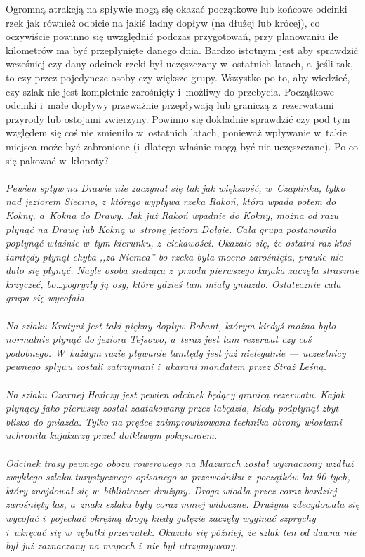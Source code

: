 \documentclass[a5paper,10pt,titlepage,twoside]{article}
\begin{document}
Ogromną atrakcją na spływie mogą się okazać początkowe lub końcowe odcinki rzek jak również odbicie na jakiś ładny dopływ (na dłużej lub krócej), co oczywiście powinno się uwzględnić podczas przygotowań, przy planowaniu ile kilometrów ma być przepłynięte danego dnia. Bardzo istotnym jest aby sprawdzić wcześniej czy dany odcinek rzeki był uczęszczany w~ostatnich latach, a~jeśli tak, to czy przez pojedyncze osoby czy większe grupy. Wszystko po to, aby wiedzieć, czy szlak nie jest kompletnie zarośnięty i~możliwy do przebycia. Początkowe odcinki i~małe dopływy przeważnie przepływają lub graniczą z~rezerwatami przyrody lub ostojami zwierzyny. Powinno się dokładnie sprawdzić czy pod tym względem się coś nie zmieniło w~ostatnich latach, ponieważ wpływanie w~takie miejsca może być zabronione (i~dlatego właśnie mogą być nie uczęszczane). Po co się pakować w~kłopoty?
\\
\\
\small{
\emph{Pewien spływ na Drawie nie zaczynał się tak jak większość, w~Czaplinku, tylko nad jeziorem Siecino, z~którego wypływa rzeka Rakoń, która wpada potem do Kokny, a~Kokna do Drawy. Jak już Rakoń wpadnie do Kokny, można od razu płynąć na Drawę lub Kokną w~stronę jeziora Dołgie. Cała grupa postanowiła popłynąć właśnie w~tym kierunku, z~ciekawości. Okazało się, że ostatni raz ktoś tamtędy płynął chyba ,,za Niemca'' bo rzeka była mocno zarośnięta, prawie nie dało się płynąć. Nagle osoba siedząca z~przodu pierwszego kajaka zaczęła strasznie krzyczeć, bo\ldots pogryzły ją osy, które gdzieś tam miały gniazdo. Ostatecznie cała grupa się wycofała.}}
\\
\\
\small{
\emph{Na szlaku Krutyni jest taki piękny dopływ Babant, którym kiedyś można było normalnie płynąć do jeziora Tejsowo, a~teraz jest tam rezerwat czy coś podobnego. W~każdym razie pływanie tamtędy jest już nielegalnie --- uczestnicy pewnego spływu zostali zatrzymani i~ukarani mandatem przez Straż Leśną.}}
\\
\\
\small{
\emph{Na szlaku Czarnej Hańczy jest pewien odcinek będący granicą rezerwatu. Kajak płynący jako pierwszy został zaatakowany przez łabędzia, kiedy podpłynął zbyt blisko do gniazda. Tylko na prędce zaimprowizowana technika obrony wiosłami uchroniła kajakarzy przed dotkliwym pokąsaniem.}}
\\
\\
\small{
\emph{Odcinek trasy pewnego obozu rowerowego na Mazurach został wyznaczony wzdłuż zwykłego szlaku turystycznego opisanego w~przewodniku z~początków lat 90-tych, który znajdował się w~biblioteczce drużyny. Droga wiodła przez coraz bardziej zarośnięty las, a~znaki szlaku były coraz mniej widoczne. Drużyna zdecydowała się wycofać i~pojechać okrężną drogą kiedy gałęzie zaczęły wyginać szprychy i~wkręcać się w~zębatki przerzutek. Okazało się później, że szlak ten od dawna nie był już zaznaczany na mapach i~nie był utrzymywany.}}
\end{document}
